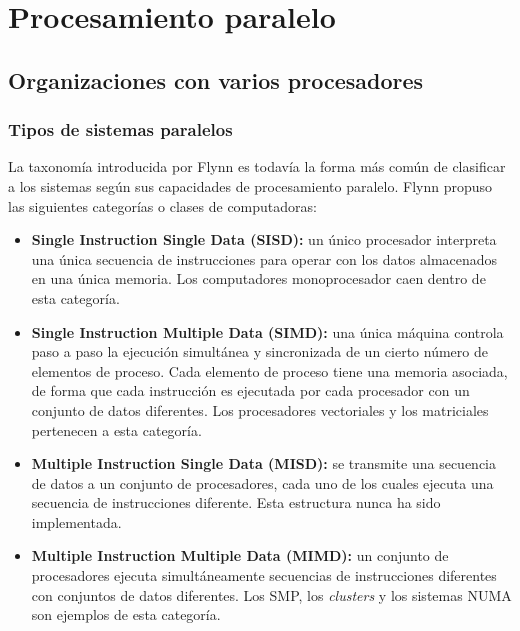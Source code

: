 \section{Procesamiento paralelo}

\subsection{Organizaciones con varios procesadores}

\subsubsection*{Tipos de sistemas paralelos}

La taxonomía introducida por Flynn es todavía la forma más común de clasificar a los sistemas según sus capacidades de procesamiento paralelo. Flynn propuso las siguientes categorías o clases de computadoras:

\begin{itemize}
  \item \textbf{Single Instruction Single Data (SISD):} un único procesador interpreta una única secuencia de instrucciones para operar con los datos almacenados en una única memoria. Los computadores monoprocesador caen dentro de esta categoría.
  \item \textbf{Single Instruction Multiple Data (SIMD):} una única máquina controla paso a paso la ejecución simultánea y sincronizada de un cierto número de elementos de proceso. Cada elemento de proceso tiene una memoria asociada, de forma que cada instrucción es ejecutada por cada procesador con un conjunto de datos diferentes. Los procesadores vectoriales y los matriciales pertenecen a esta categoría.
  \item \textbf{Multiple Instruction Single Data (MISD):} se transmite una secuencia de datos a un conjunto de procesadores, cada uno de los cuales ejecuta una secuencia de instrucciones diferente. Esta estructura nunca ha sido implementada.
  \item \textbf{Multiple Instruction Multiple Data (MIMD):} un conjunto de procesadores ejecuta simultáneamente secuencias de instrucciones diferentes con conjuntos de datos diferentes. Los SMP, los \textit{clusters} y los sistemas NUMA son ejemplos de esta categoría.
\end{itemize}

